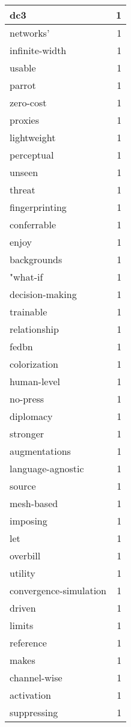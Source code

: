 \begin{table}[h]
\begin{tabular}{|l|r|}
\hline
dc3 & 1 \\
\hline
networks’ & 1 \\
\hline
infinite-width & 1 \\
\hline
usable & 1 \\
\hline
parrot & 1 \\
\hline
zero-cost & 1 \\
\hline
proxies & 1 \\
\hline
lightweight & 1 \\
\hline
perceptual & 1 \\
\hline
unseen & 1 \\
\hline
threat & 1 \\
\hline
fingerprinting & 1 \\
\hline
conferrable & 1 \\
\hline
enjoy & 1 \\
\hline
backgrounds & 1 \\
\hline
"what-if & 1 \\
\hline
decision-making & 1 \\
\hline
trainable & 1 \\
\hline
relationship & 1 \\
\hline
fedbn & 1 \\
\hline
colorization & 1 \\
\hline
human-level & 1 \\
\hline
no-press & 1 \\
\hline
diplomacy & 1 \\
\hline
stronger & 1 \\
\hline
augmentations & 1 \\
\hline
language-agnostic & 1 \\
\hline
source & 1 \\
\hline
mesh-based & 1 \\
\hline
imposing & 1 \\
\hline
let & 1 \\
\hline
overbill & 1 \\
\hline
utility & 1 \\
\hline
convergence-simulation & 1 \\
\hline
driven & 1 \\
\hline
limits & 1 \\
\hline
reference & 1 \\
\hline
makes & 1 \\
\hline
channel-wise & 1 \\
\hline
activation & 1 \\
\hline
suppressing & 1 \\

\end{tabular}
\end{table}
